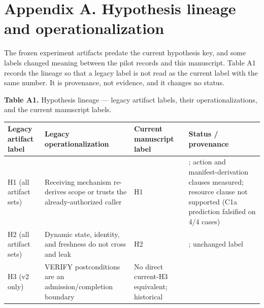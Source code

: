 \documentclass[
  10pt,
]{article}
\newcounter{none} %
\let\origtexttt\texttt
\renewcommand{\texttt}[1]{{\upshape\origtexttt{#1}}}
\renewcommand{\_}{\allowbreak\origunderscore}
\begin{document}
\section{Appendix A. Hypothesis lineage and
operationalization}\label{appendix-a.-hypothesis-lineage-and-operationalization}

The frozen experiment artifacts predate the current hypothesis key, and
some labels changed meaning between the pilot records and this
manuscript. Table A1 records the lineage so that a legacy label is not
read as the current label with the same number. It is provenance, not
evidence, and it changes no status.

\textbf{Table A1.} Hypothesis lineage --- legacy artifact labels, their
operationalizations, and the current manuscript labels.

{\def\LTcaptype{none} %
\begin{longtable}[]{@{}
  >{\raggedright\arraybackslash}p{}
  >{\raggedright\arraybackslash}p{}
  >{\raggedright\arraybackslash}p{}
  >{\raggedright\arraybackslash}p{}@{}}
\toprule\noalign{}
\begin{minipage}[b]{\linewidth}\raggedright
Legacy artifact label
\end{minipage} & \begin{minipage}[b]{\linewidth}\raggedright
Legacy operationalization
\end{minipage} & \begin{minipage}[b]{\linewidth}\raggedright
Current manuscript label
\end{minipage} & \begin{minipage}[b]{\linewidth}\raggedright
Status / provenance
\end{minipage} \\
\midrule\noalign{}
\endhead
\bottomrule\noalign{}
\endlastfoot
H1 (all artifact sets) & Receiving mechanism re-derives scope or trusts
the already-authorized caller & H1 & \texttt{REFINED}; action and
manifest-derivation clauses measured; resource clause not supported (C1a
prediction falsified on 4/4 cases) \\
H2 (all artifact sets) & Dynamic state, identity, and freshness do not
cross and leak & H2 & \texttt{SUPPORTED}; unchanged label \\
H3 (v2 only) & VERIFY postconditions are an admission/completion
boundary & No direct current-H3 equivalent; historical

\end{longtable}}
\end{document}
